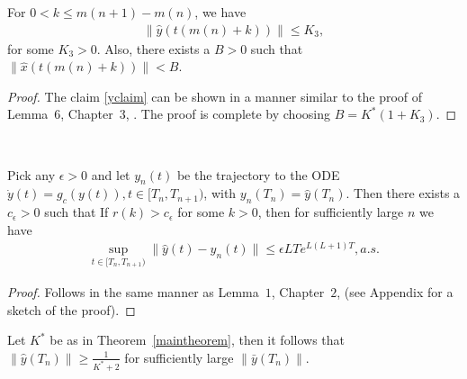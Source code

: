 \begin{lemma}\label{bddy}
For $0<k\leq m(n+1)-m(n)$, we have
\begin{align}\label{yclaim}
\parallel\hat{y}(t(m(n)+k))\parallel\leq K_3,
\end{align}
for some $K_3>0$. Also, there exists a $B>0$ such that $\parallel \hat{x}(t(m(n)+k))\parallel <B$.
\end{lemma}
\begin{proof}
The claim \eqref{yclaim} can be shown in a manner similar to the proof of Lemma~$6$, Chapter~$3$, \cite{SA}. The proof is complete by choosing $B=K^*(1+K_3)$.
\end{proof}\\

\begin{comment}
\begin{lemma}\label{ftsres}
Define the set $A^\epsilon (y)\stackrel{def}{=}\{ x\colon ||x-\lambda_\infty(y)||<\epsilon\}$. For any $\epsilon>0$, there exists $c_\epsilon>1$ such that the trajectory $(\hat{x}(t),\hat{y}(t)) \in (A^\epsilon(\hat{y}(t)),\hat{y}(t)),  \mb \forall t\in [T_n,T_{n+1})$ if $r(n)>c_\epsilon$.
\end{lemma}
\begin{proof}
Proof follows from Lemmas~\ref{bddy}, as well as Lemma~$1$, Chapter~$6$, \cite{SA}, and picking $c_\epsilon$ as in Lemma~\ref{neartraj}.
\end{proof}
\end{comment}
\begin{lemma}\label{tracky}
Pick any $\epsilon >0$ and let $y_n(t)$ be the trajectory to the ODE $\dot{y}(t)=g_c(y(t)), t\in [T_n,T_{n+1})$, with $y_n(T_n)=\hat{y}(T_n)$. Then there exists a $c_\epsilon>0$ such that If $r(k)>c_\epsilon$ for some $k>0$, then for sufficiently large $n$ we have
\begin{align}
\sup_{t \in [T_n,T_{n+1})} \parallel \hat{y}(t)-y_n(t)\parallel \leq \epsilon LT e^{L(L+1)T}, a.s.
\end{align}
\end{lemma}
\begin{proof}
Follows in the same manner as Lemma~$1$, Chapter~$2$, \cite{SA} (see Appendix for a sketch of the proof).
\end{proof}
\begin{lemma}\label{haty}
Let $K^*$ be as in Theorem~\ref{maintheorem}, then it follows that $\parallel \hat{y}(T_n)\parallel
\geq \frac{1}{K^*+2}$ for sufficiently large $\parallel \bar{y}(T_n)\parallel$.
\end{lemma}
